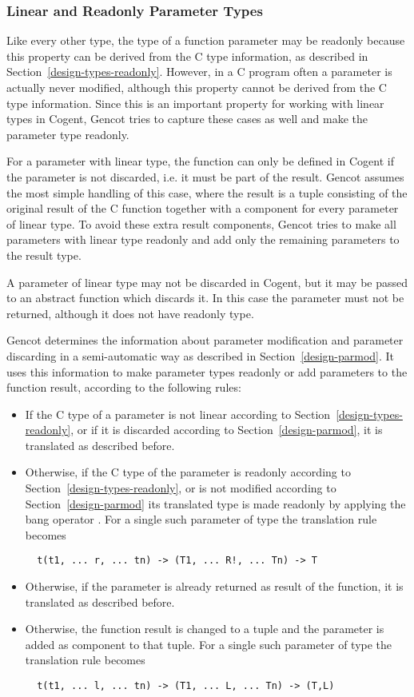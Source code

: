 \subsubsection{Linear and Readonly Parameter Types}

Like every other type, the type of a function parameter may be readonly because this property can be derived
from the C type information, as described in Section~\ref{design-types-readonly}. However, in a C program 
often a parameter is actually never modified, although this property cannot be derived from the C type information.
Since this is an important property for working with linear types in Cogent, Gencot tries to capture these
cases as well and make the parameter type readonly.

For a parameter with linear type, the function can only be defined in Cogent if the parameter is not discarded,
i.e. it must be part of the result. Gencot assumes the most simple handling of this case, where the result
is a tuple consisting of the original result of the C function together with a component for every parameter
of linear type. To avoid these extra result components, Gencot tries to make all parameters with linear type
readonly and add only the remaining parameters to the result type.

A parameter of linear type may not be discarded in Cogent, but it may be passed to an abstract function which discards
it. In this case the parameter must not be returned, although it does not have readonly type.

Gencot determines the information about parameter modification and parameter discarding in a semi-automatic way
as described in Section~\ref{design-parmod}. It uses this information to make parameter types readonly or
add parameters to the function result, according to the following rules:
\begin{itemize}
\item If the C type of a parameter is not linear according to Section~\ref{design-types-readonly}, or if it
is discarded according to Section~\ref{design-parmod}, it is translated as described before.
\item Otherwise, if the C type of the parameter is readonly according to Section~\ref{design-types-readonly}, or
is not modified according to Section~\ref{design-parmod} its translated type is made readonly by applying the
bang operator \code{!}. For a single such parameter of type  the translation rule becomes
\begin{verbatim}
  t(t1, ... r, ... tn) -> (T1, ... R!, ... Tn) -> T
\end{verbatim}
\item Otherwise, if the parameter is already returned as result of the function, it is translated as described before.
\item Otherwise, the function result is changed to a tuple and the parameter is added as component to that tuple.
For a single such parameter of type  the translation rule becomes
\begin{verbatim}
  t(t1, ... l, ... tn) -> (T1, ... L, ... Tn) -> (T,L)
\end{verbatim}
\end{itemize}

